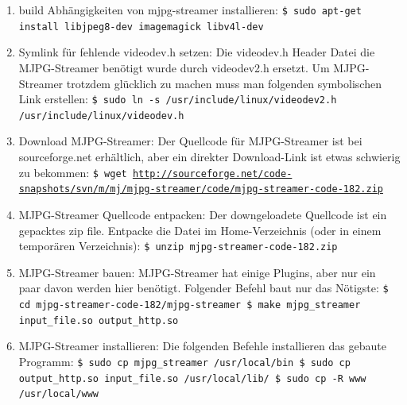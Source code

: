 \documentclass[12pt,a4paper,titlepage]{scrartcl} %
\begin{document}
\begin{enumerate}
\bfseries

\item build Abhängigkeiten von mjpg-streamer installieren:\newline
\texttt{\$ sudo apt-get install libjpeg8-dev imagemagick libv4l-dev}

\item Symlink für fehlende videodev.h setzen:\newline
\textnormal{Die videodev.h Header Datei die MJPG-Streamer benötigt wurde durch \mbox{videodev2.h} ersetzt. Um MJPG-Streamer trotzdem glücklich zu machen muss man folgenden symbolischen Link erstellen:}\newline
\texttt{\$ sudo ln -s /usr/include/linux/videodev2.h /usr/include/linux/videodev.h}

\item Download MJPG-Streamer:\newline
\textnormal{Der Quellcode für MJPG-Streamer ist bei sourceforge.net erhältlich, aber ein direkter Download-Link ist etwas schwierig zu bekommen:}\newline
\texttt{\$ wget \url{http://sourceforge.net/code-snapshots/svn/m/mj/mjpg-streamer/code/mjpg-streamer-code-182.zip}}

\item MJPG-Streamer Quellcode entpacken:\newline
\textnormal{Der downgeloadete Quellcode ist ein gepacktes zip file. Entpacke die Datei im Home-Verzeichnis (oder in einem temporären Verzeichnis):}\newline
\texttt{\$ unzip mjpg-streamer-code-182.zip}

\item MJPG-Streamer bauen:\newline
\textnormal{MJPG-Streamer hat einige Plugins, aber nur ein paar davon werden hier benötigt. Folgender Befehl baut nur das Nötigste:}\newline
\texttt{\$ cd mjpg-streamer-code-182/mjpg-streamer\newline
\$ make mjpg\_streamer input\_file.so output\_http.so}

\item MJPG-Streamer installieren:\newline
\textnormal{Die folgenden Befehle installieren das gebaute Programm:}\newline
\texttt{\$ sudo cp mjpg\_streamer /usr/local/bin\newline
\$ sudo cp output\_http.so input\_file.so /usr/local/lib/\newline
\$ sudo cp -R www /usr/local/www}


\end{enumerate}
\end{document}
